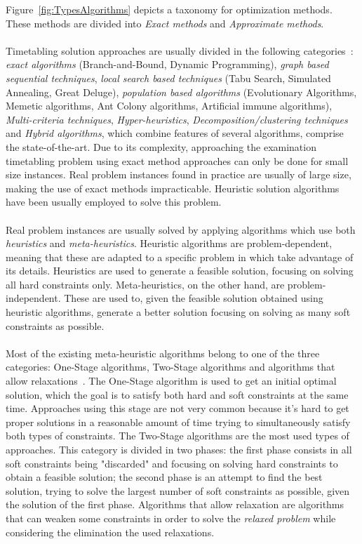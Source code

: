 Figure~\ref{fig:TypesAlgorithms} depicts a taxonomy for optimization methods. These methods are divided into \textit{Exact methods} and \textit{Approximate methods}.\\
\\
Timetabling solution approaches are usually divided in the following categories~\cite{Qu2009}: \textit{exact algorithms} (Branch-and-Bound, Dynamic Programming), \textit{graph based sequential techniques}, \textit{local search based techniques} (Tabu Search, Simulated Annealing, Great Deluge), \textit{population based algorithms} (Evolutionary Algorithms, Memetic algorithms, Ant Colony algorithms, Artificial immune algorithms), \textit{Multi-criteria techniques}, \textit{Hyper-heuristics}, \textit{Decomposition/clustering techniques} and \textit{Hybrid algorithms}, which combine features of several algorithms, comprise the state-of-the-art. Due to its complexity, approaching the examination timetabling problem using exact method approaches can only be done for small size instances. Real problem instances found in practice are usually of large size, making the use of exact methods impracticable. Heuristic solution algorithms have been usually employed to solve this problem.\\
\\
Real problem instances are usually solved by applying algorithms which use both \textit{heuristics} and \textit{meta-heuristics}. Heuristic algorithms are problem-dependent, meaning that these are adapted to a specific problem in which take advantage of its details. Heuristics are used to generate a feasible solution, focusing on solving all hard constraints only. Meta-heuristics, on the other hand, are problem-independent. These are used to, given the feasible solution obtained using heuristic algorithms, generate a better solution focusing on solving as many soft constraints as possible.\\
\\
Most of the existing meta-heuristic algorithms belong to one of the three categories: One-Stage algorithms, Two-Stage algorithms and algorithms that allow relaxations~\cite{Lewis2007}. The One-Stage algorithm is used to get an initial optimal solution, which the goal is to satisfy both hard and soft constraints at the same time. Approaches using this stage are not very common because it's hard to get proper solutions in a reasonable amount of time trying to simultaneously satisfy both types of constraints. The Two-Stage algorithms are the most used types of approaches. This category is divided in two phases: the first phase consists in all soft constraints being "discarded" and focusing on solving hard constraints to obtain a feasible solution; the second phase is an attempt to find the best solution, trying to solve the largest number of soft constraints as possible, given the solution of the first phase. Algorithms that allow relaxation are algorithms that can weaken some constraints in order to solve the \textit{relaxed problem} while considering the elimination the used relaxations.

